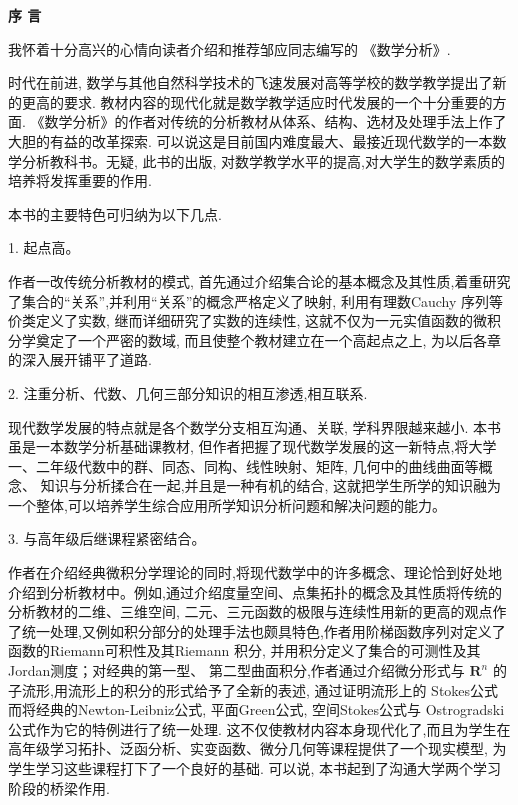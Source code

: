 \begin{center}
	\textbf{\heiti \large 序 言}
\end{center}


我怀着十分高兴的心情向读者介绍和推荐邹应同志编写的 《数学分析》.

时代在前进, 数学与其他自然科学技术的飞速发展对高等学校的数学教学提出了新的更高的要求. 教材内容的现代化就是数学教学适应时代发展的一个十分重要的方面. 《数学分析》的作者对传统的分析教材从体系、结构、选材及处理手法上作了大胆的有益的改革探索. 可以说这是目前国内难度最大、最接近现代数学的一本数学分析教科书。无疑, 此书的出版, 对数学教学水平的提高,对大学生的数学素质的培养将发挥重要的作用.

本书的主要特色可归纳为以下几点.

1. 起点高。

作者一改传统分析教材的模式, 首先通过介绍集合论的基本概念及其性质,着重研究了集合的“关系”,并利用“关系”的概念严格定义了映射, 利用有理数Cauchy 序列等价类定义了实数, 继而详细研究了实数的连续性, 这就不仅为一元实值函数的微积分学奠定了一个严密的数域, 而且使整个教材建立在一个高起点之上, 为以后各章的深入展开铺平了道路.

2. 注重分析、代数、几何三部分知识的相互渗透,相互联系.

现代数学发展的特点就是各个数学分支相互沟通、关联, 学科界限越来越小. 本书虽是一本数学分析基础课教材, 但作者把握了现代数学发展的这一新特点,将大学一、二年级代数中的群、同态、同构、线性映射、矩阵, 几何中的曲线曲面等概念、 知识与分析揉合在一起,并且是一种有机的结合, 这就把学生所学的知识融为一个整体,可以培养学生综合应用所学知识分析问题和解决问题的能力。

3. 与高年级后继课程紧密结合。

作者在介绍经典微积分学理论的同时,将现代数学中的许多概念、理论恰到好处地介绍到分析教材中。例如,通过介绍度量空间、点集拓扑的概念及其性质将传统的分析教材的二维、三维空间, 二元、三元函数的极限与连续性用新的更高的观点作了统一处理,又例如积分部分的处理手法也颇具特色,作者用阶梯函数序列对定义了函数的Riemann可积性及其Riemann 积分, 并用积分定义了集合的可测性及其Jordan测度；对经典的第一型、 第二型曲面积分,作者通过介绍微分形式与 \({\mathbf{R}}^{n}\) 的子流形,用流形上的积分的形式给予了全新的表述, 通过证明流形上的 Stokes公式而将经典的Newton-Leibniz公式, 平面Green公式, 空间Stokes公式与 Ostrogradski 公式作为它的特例进行了统一处理. 这不仅使教材内容本身现代化了,而且为学生在高年级学习拓扑、泛函分析、实变函数、微分几何等课程提供了一个现实模型, 为学生学习这些课程打下了一个良好的基础. 可以说, 本书起到了沟通大学两个学习阶段的桥梁作用.


